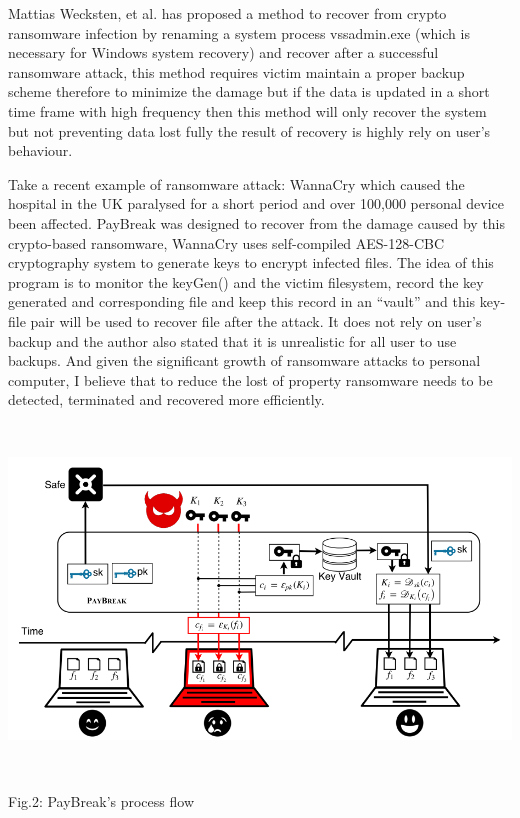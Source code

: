 \documentclass[]{PLR-ShaofengLiu}
\begin{document}
 
 

Mattias Wecksten, et al.\cite{IEEE 2nd:2016} has proposed a method to 
recover from crypto ransomware infection by renaming a system process 
vssadmin.exe (which is necessary for Windows system recovery) and recover 
after a successful ransomware attack, this method requires victim maintain 
a proper backup scheme therefore to minimize the damage but if the data is 
updated in a short time frame with high frequency then this method will 
only recover the system but not preventing data lost fully the result of 
recovery is highly rely on user’s behaviour.

Take a recent example of ransomware attack: WannaCry\cite{UN2,Secureworks} 
which caused the hospital in the UK paralysed for a short period and 
over 100,000 personal device been affected. PayBreak\cite{PayBreak:2017} 
was designed to recover from the damage caused by this crypto-based 
ransomware,  WannaCry uses self-compiled AES-128-CBC cryptography system 
to generate keys to encrypt infected files. The idea of this program is 
to monitor the keyGen() and the victim filesystem, record the key 
generated and corresponding file and keep this record in an “vault” 
and this key-file pair will be used to recover file after the attack. 
It does not rely on user’s backup and the author also stated that it 
is unrealistic for all user to use backups. And given the significant growth 
of ransomware attacks to personal computer\cite{Symantec:2017, ACC}, I believe
that to reduce the lost of property ransomware needs to be detected, terminated and recovered
more efficiently.
\includegraphics[width=16cm , height=10cm]{paybreak.png}
                        Fig.2: PayBreak's process flow
\end{document}

